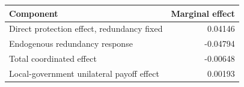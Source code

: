 \begin{tabular}{lr}\toprule
Component & Marginal effect \\\midrule
Direct protection effect, redundancy fixed & 0.04146 \\
Endogenous redundancy response & -0.04794 \\
Total coordinated effect & -0.00648 \\
Local-government unilateral payoff effect & 0.00193 \\\bottomrule
\end{tabular}
